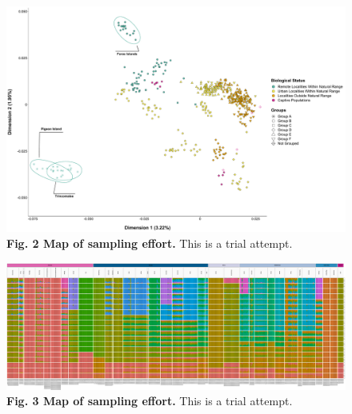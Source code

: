 \documentclass[twoside, british, a4paper]{article}
\begin{document}
\begin{figure}[!ht]
\centering
\includegraphics[width=1\textwidth]{../FPG--Plots/FPG--MDS/FPG--MDS_12.pdf}
\caption*{ \scriptsize \textbf{Fig. 2 Map of sampling effort.} This is a trial attempt.}
\label{MainText:FPG--MDS}
\end{figure}

\begin{figure}[!ht]
\centering
\includegraphics[width=1\textwidth]{../FPG--Plots/FPG--ngsAdmix/FPG--ngsAdmix.pdf}
\caption*{ \scriptsize \textbf{Fig. 3 Map of sampling effort.} This is a trial attempt.}
\label{MainText:FPG--ngsAdmix}
\end{figure}

\newpage
\clearpage
\end{document}
